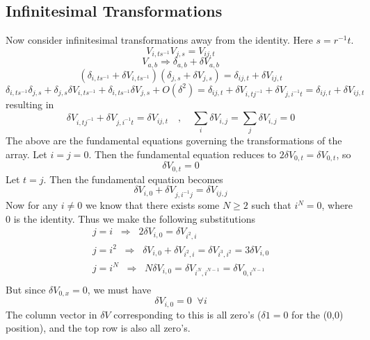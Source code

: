 \documentclass[12pt]{article}
\begin{document}
\subsection{ Infinitesimal Transformations}
Now consider infinitesimal transformations away from the identity.  Here
$s = r^{-1}t$.
$$V_{i,ts^{-1}} V_{j,s} = V_{ij,t}$$
\begin{equation}
V_{a,b} \Rightarrow \delta_{a,b} + \delta V_{a,b}
\end{equation}
$$\left( \delta_{i,ts^{-1}} + \delta V_{i,ts^{-1}} \right) \left(
\delta_{j,s} + \delta V_{j,s} \right) = \delta_{ij,t} + \delta V_{ij,t}$$
$$\delta_{i,ts^{-1}} \delta_{j,s} + \delta_{j,s} \delta V_{i,ts^{-1}} +
\delta_{i,ts^{-1}} \delta V_{j,s} + O(\delta^2) =
\delta_{ij,t} + \delta V_{i,tj^{-1}} + \delta V_{j,i^{-1}t} =
\delta_{ij,t} + \delta V_{ij,t}$$
resulting in
\begin{equation}
\delta V_{i,tj^{-1}} + \delta V_{j,i^{-1}t} = \delta V_{ij,t} \quad , \quad
\sum_i \delta V_{i,j} = \sum_j \delta V_{i,j} = 0
\end{equation}
 The above are the fundamental equations governing the transformations of
the array.
 Let $i = j = 0$.  Then the fundamental equation reduces to
$2\delta V_{0,t} = \delta V_{0,t}$, so
\begin{equation}
\delta V_{0,t} = 0
\end{equation}
 Let $t = j$.  Then the fundamental equation becomes
\begin{equation}
\delta V_{i,0} + \delta V_{j,i^{-1}j} = \delta V_{ij,j}
\end{equation}
 Now for any $i \neq 0$ we know that there exists some $N \geq 2$ such that
$i^N = 0$, where $0$ is the identity.  Thus we make the following substitutions
\begin{eqnarray}
j = i \;\; \Rightarrow \;\; 2 \delta V_{i,0} = \delta V_{i^2,i} \\
j = i^2 \;\; \Rightarrow \;\; \delta V_{i,0} + \delta V_{i^2,i} =
\delta V_{i^3,i^2} = 3 \delta V_{i,0} \\
j = i^N \;\; \Rightarrow \;\; N \delta V_{i,0} = \delta V_{i^N,i^{N-1}}
= \delta V_{0,i^{N-1}} \\
\end{eqnarray}
 But since $\delta V_{0,x} = 0$, we must have
\begin{equation}
\delta V_{i,0} = 0 \;\; \forall i
\end{equation}
 The column vector in $\delta V$ corresponding to this is all zero's
($ \delta 1 = 0$ for the (0,0) position),
and the top row is also all zero's.
\end{document}
